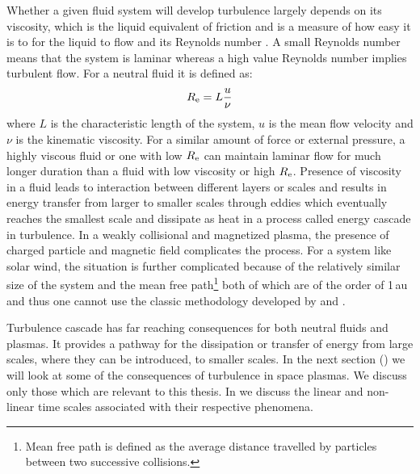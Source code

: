         Whether a given fluid system will develop turbulence largely depends on its viscosity, which
        is the liquid equivalent of friction and is a measure of how easy it is to for the liquid to
        flow \citep{Chapman1916, Jeans1905} and its Reynolds number
        \citep{Reynolds1883,Reynolds1886,Matthaeus1980}. A small Reynolds number means that the
        system is laminar whereas a high value Reynolds number implies turbulent flow. For a neutral
        fluid it is defined as:
        \begin{align}
            R_{\rm e} = L \frac{u}{\nu} \label{eq:rnld}
        \end{align}
        where $L$ is the characteristic length of the system, $u$ is the mean flow velocity and
        $\nu$ is the kinematic viscosity. For a similar amount of force or external pressure, a
        highly viscous fluid or one with low $R_{\rm e}$ can maintain laminar flow for much longer
        duration than a fluid with low viscosity or high $R_{\rm e}$. Presence of viscosity in a
        fluid leads to interaction between different layers or scales and results in energy transfer
        from larger to smaller scales through eddies which eventually reaches the smallest scale and
        dissipate as heat \citep{Kolmogorov1941a, Kolmogorov1941} in a process called energy cascade
        in turbulence. In a weakly collisional and magnetized plasma, the presence of charged
        particle and magnetic field complicates the process. For a system like solar wind, the
        situation is further complicated because of the relatively similar size of the system and
        the mean free path\footnote{Mean free path is defined as the average distance travelled by
        particles between two successive collisions.}\citep[Appendix 2]{Echim2010} both of which are
        of the order of 1\,au \citep[Table 1]{Verscharen2019} and thus one cannot use the classic
        methodology developed by \citet{Enskog1917} and \citet{Chapman1918}.

        Turbulence cascade has far reaching consequences for both neutral fluids and plasmas. It
        provides a pathway for the dissipation or transfer of energy from large scales, where they
        can be introduced, to smaller scales. In the next section () we will look
        at some of the consequences of turbulence in space plasmas. We discuss only those which are
        relevant to this thesis. In  we discuss the linear and non-linear time scales
        associated with their respective phenomena.

